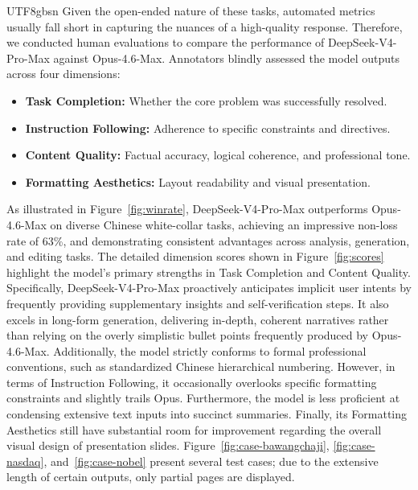 \documentclass[11pt, a4paper, logo, copyright, nonumbering]{deepseek}
\newcommand{\dsvivpm}{DeepSeek-V4-Pro-Max}
\begin{document}
\begin{CJK*}{UTF8}{gbsn}
Given the open-ended nature of these tasks, automated metrics usually fall short in capturing the nuances of a high-quality response.
Therefore, we conducted human evaluations to compare the performance of \dsvivpm{} against Opus-4.6-Max. 
Annotators blindly assessed the model outputs across four dimensions:

\begin{itemize}
    \item \textbf{Task Completion:} Whether the core problem was successfully resolved.
    \item \textbf{Instruction Following:} Adherence to specific constraints and directives.
    \item \textbf{Content Quality:} Factual accuracy, logical coherence, and professional tone.
    \item \textbf{Formatting Aesthetics:} Layout readability and visual presentation.
\end{itemize}

As illustrated in Figure~\ref{fig:winrate}, \dsvivpm{} outperforms Opus-4.6-Max on diverse Chinese white-collar tasks, achieving an impressive non-loss rate of 63\%, and demonstrating consistent advantages across analysis, generation, and editing tasks. 
The detailed dimension scores shown in Figure~\ref{fig:scores} highlight the model's primary strengths in Task Completion and Content Quality. 
Specifically, \dsvivpm{} proactively anticipates implicit user intents by frequently providing supplementary insights and self-verification steps. 
It also excels in long-form generation, delivering in-depth, coherent narratives rather than relying on the overly simplistic bullet points frequently produced by Opus-4.6-Max. 
Additionally, the model strictly conforms to formal professional conventions, such as standardized Chinese hierarchical numbering.
However, in terms of Instruction Following, it occasionally overlooks specific formatting constraints and slightly trails Opus. 
Furthermore, the model is less proficient at condensing extensive text inputs into succinct summaries. 
Finally, its Formatting Aesthetics still have substantial room for improvement regarding the overall visual design of presentation slides.
Figure~\ref{fig:case-bawangchaji}, \ref{fig:case-nasdaq}, and~\ref{fig:case-nobel} present several test cases; due to the extensive length of certain outputs, only partial pages are displayed.


\end{CJK*}
\end{document}
